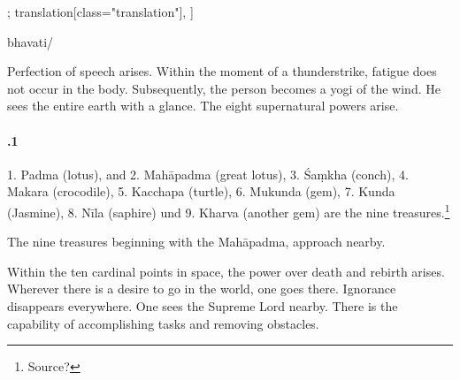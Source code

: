 \begin{alignment}[
  texts=edition[class="edition"];
  translation[class="translation"],
  ]
\begin{edition}
\begin{prose}
{  }
bhavati/
\end{prose}
  \end{edition}
  \begin{translation}
    \begin{tlate}
      \noindent
      Perfection of speech arises. Within the moment of a thunderstrike, fatigue does not occur in the body. Subsequently, the person becomes a yogi of the wind. He sees the entire earth with a glance. The eight supernatural powers arise.

      \paragraph{.1 }  1. Padma (lotus), and 2. Mahāpadma (great lotus), 3. Śaṃkha (conch), 4. Makara (crocodile), 5. Kacchapa (turtle), 6. Mukunda (gem), 7. Kunda (Jasmine), 8. Nīla (saphire) und 9. Kharva (another gem) are the nine treasures.\footnote{Source?}
      
      \bigskip
      The nine treasures beginning with the Mahāpadma, approach nearby.
\bigskip

Within the ten cardinal points in space, the power over death and rebirth arises. Wherever there is a desire to go in the world, one goes there. Ignorance disappears everywhere. One sees the Supreme Lord nearby. There is the capability of accomplishing tasks and removing obstacles.
    \end{tlate}
  \end{translation}
\end{alignment}
\pagebreak %
